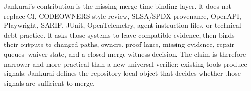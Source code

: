 Jankurai's contribution is the missing merge-time binding layer. It does not replace CI, CODEOWNERS-style review, SLSA/SPDX provenance, OpenAPI, Playwright, SARIF, JUnit, OpenTelemetry, agent instruction files, or technical-debt practice. It asks those systems to leave compatible evidence, then binds their outputs to changed paths, owners, proof lanes, missing evidence, repair queues, waiver state, and a closed merge-witness decision. The claim is therefore narrower and more practical than a new universal verifier: existing tools produce signals; Jankurai defines the repository-local object that decides whether those signals are sufficient to merge.
